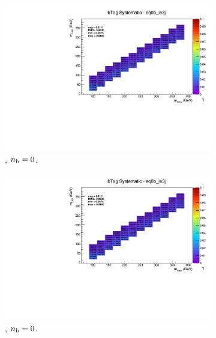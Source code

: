 \begin{figure}[ht!]
  \centering
  \begin{subfigure}[b]{0.32\textwidth}
    \includegraphics[width=\textwidth, page=12]{Figs/sms/t2degen/v19/systs_v2/T2_4body_bTag_eq0b_le3j.pdf}
    \caption{\njlow, $n_{\text{b}} = 0$.}
  \end{subfigure}
  \begin{subfigure}[b]{0.32\textwidth}
    \includegraphics[width=\textwidth, page=8]{Figs/sms/t2degen/v19/systs_v2/T2_4body_bTag_eq0b_le3j.pdf}
    \caption{\njlow, $n_{\text{b}} = 0$.}
  \end{subfigure}
  \begin{subfigure}[b]{0.32\textwidth}

\end{subfigure}
\end{figure}
